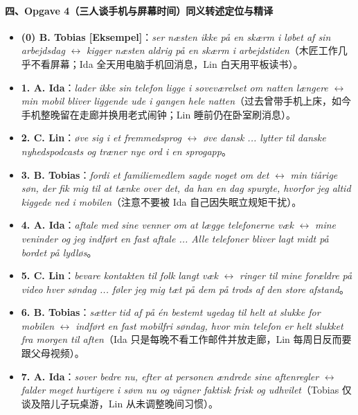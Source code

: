 \paragraph*{四、Opgave 4（三人谈手机与屏幕时间）同义转述定位与精译}
\begin{itemize}
  \item \textbf{(0) B. Tobias [Eksempel]}：\textit{ser næsten ikke på en skærm i løbet af sin arbejdsdag} $\leftrightarrow$ \textit{kigger næsten aldrig på en skærm i arbejdstiden}（木匠工作几乎不看屏幕；Ida 全天用电脑手机回消息，Lin 白天用平板读书）。
  \item \textbf{1. A. Ida}：\textit{lader ikke sin telefon ligge i soveværelset om natten længere} $\leftrightarrow$ \textit{min mobil bliver liggende ude i gangen hele natten}（过去曾带手机上床，如今手机整晚留在走廊并换用老式闹钟；Lin 睡前仍在卧室刷消息）。
  \item \textbf{2. C. Lin}：\textit{øve sig i et fremmedsprog} $\leftrightarrow$ \textit{øve dansk ... lytter til danske nyhedspodcasts og træner nye ord i en sprogapp}。
  \item \textbf{3. B. Tobias}：\textit{fordi et familiemedlem sagde noget om det} $\leftrightarrow$ \textit{min tiårige søn, der fik mig til at tænke over det, da han en dag spurgte, hvorfor jeg altid kiggede ned i mobilen}（注意不要被 Ida 自己因失眠立规矩干扰）。
  \item \textbf{4. A. Ida}：\textit{aftale med sine venner om at lægge telefonerne væk} $\leftrightarrow$ \textit{mine veninder og jeg indført en fast aftale ... Alle telefoner bliver lagt midt på bordet på lydløs}。
  \item \textbf{5. C. Lin}：\textit{bevare kontakten til folk langt væk} $\leftrightarrow$ \textit{ringer til mine forældre på video hver søndag ... føler jeg mig tæt på dem på trods af den store afstand}。
  \item \textbf{6. B. Tobias}：\textit{sætter tid af på én bestemt ugedag til helt at slukke for mobilen} $\leftrightarrow$ \textit{indført en fast mobilfri søndag, hvor min telefon er helt slukket fra morgen til aften}（Ida 只是每晚不看工作邮件并放走廊，Lin 每周日反而要跟父母视频）。
  \item \textbf{7. A. Ida}：\textit{sover bedre nu, efter at personen ændrede sine aftenregler} $\leftrightarrow$ \textit{falder meget hurtigere i søvn nu og vågner faktisk frisk og udhvilet}（Tobias 仅谈及陪儿子玩桌游，Lin 从未调整晚间习惯）。
\end{itemize}

